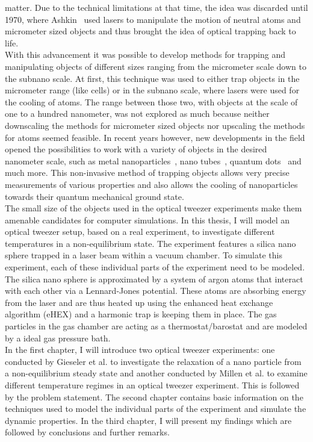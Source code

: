 \documentclass[12pt]{article}
\begin{document}
matter. Due to the technical limitations at that time, the idea was discarded until 1970, where Ashkin~\cite{Ashkin2000} used lasers to manipulate the
motion of neutral atoms and micrometer sized objects and thus brought the idea of optical trapping back to life.\\
With this advancement it was possible to develop methods for trapping and manipulating objects of different sizes ranging from the micrometer scale
down to the subnano scale. At first, this technique was used to either trap objects in the micrometer range (like cells) or in the subnano scale,
where lasers were used for the cooling of atoms. The range between those two, with objects at the scale of one to a hundred nanometer, was not
explored as much because neither downscaling the methods for micrometer sized objects nor upscaling the methods for atoms seemed feasible. In recent
years however, new developments in the field opened the possibilities to work with a variety of objects in the desired nanometer scale, such as metal
nanoparticles~\cite{Svoboda1994}, nano tubes~\cite{Tan2004}, quantum dots~\cite{Jauffred2008} and much more. 
This non-invasive method of trapping objects allows very precise measurements of various
properties and also allows the cooling of nanoparticles towards their quantum mechanical ground state.\\
The small size of the objects used in the optical tweezer experiments make them amenable candidates for computer simulations. In this thesis, I will
model an optical tweezer setup, based on a real experiment, to investigate different temperatures in a non-equilibrium state. 
The experiment features a silica nano sphere trapped in a laser beam within a vacuum chamber. To simulate this experiment, each of these individual parts 
of the experiment need to be modeled. The silica nano sphere is approximated by a system of argon atoms that interact with each other via a 
Lennard-Jones potential. These atoms are absorbing energy from the laser and are thus heated up using the enhanced heat exchange algorithm (eHEX) 
and a harmonic trap is keeping them in place. The gas particles in the gas chamber are acting as a thermostat/barostat and are modeled by a ideal
gas pressure bath.\\
In the first chapter, I will introduce two optical tweezer experiments: one conducted by Gieseler et al. to investigate the relaxation of a nano particle
from a non-equilibrium steady state and another conducted by Millen et al. to examine different temperature regimes in an optical tweezer experiment. 
This is followed by the problem statement. The second chapter contains basic
information on the techniques used to model the individual parts of the experiment and 
simulate the dynamic properties. In the third chapter, I will present my findings which
are followed by conclusions and further remarks.
\end{document}
